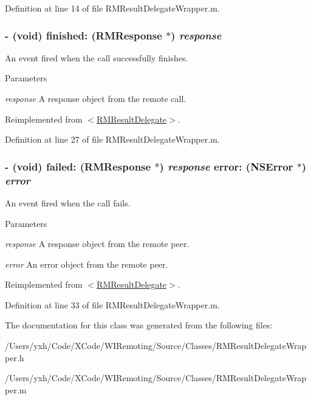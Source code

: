 Definition at line 14 of file RMResultDelegateWrapper.m.\hypertarget{interface_r_m_result_delegate_wrapper_ac631e09ab641294f124b0e7d81b455c3}{
\subsubsection[{finished:}]{\setlength{\rightskip}{0pt plus 5cm}-\/ (void) finished: ({\bf RMResponse} $\ast$) {\em response}}}
\label{interface_r_m_result_delegate_wrapper_ac631e09ab641294f124b0e7d81b455c3}


An event fired when the call successfully finishes. 
\begin{DoxyParams}{Parameters}
\item[{\em response}]A response object from the remote call. \end{DoxyParams}


Reimplemented from \hyperlink{protocol_r_m_result_delegate-p_a965fe7cc4e150bb6ecf7cbb02b9c7248}{$<$RMResultDelegate$>$}.

Definition at line 27 of file RMResultDelegateWrapper.m.\hypertarget{interface_r_m_result_delegate_wrapper_ad4fccdd6b67ba89b4abe76f64708b82c}{
\subsubsection[{failed:error:}]{\setlength{\rightskip}{0pt plus 5cm}-\/ (void) failed: ({\bf RMResponse} $\ast$) {\em response}\/ error: (NSError $\ast$) {\em error}}}
\label{interface_r_m_result_delegate_wrapper_ad4fccdd6b67ba89b4abe76f64708b82c}


An event fired when the call fails. 
\begin{DoxyParams}{Parameters}
\item[{\em response}]A response object from the remote peer. \item[{\em error}]An error object from the remote peer. \end{DoxyParams}


Reimplemented from \hyperlink{protocol_r_m_result_delegate-p_a3521cd9555449b32aabdb759d2dadce5}{$<$RMResultDelegate$>$}.

Definition at line 33 of file RMResultDelegateWrapper.m.

The documentation for this class was generated from the following files:\begin{DoxyCompactItemize}
\item 
/Users/yxh/Code/XCode/WIRemoting/Source/Classes/RMResultDelegateWrapper.h\item 
/Users/yxh/Code/XCode/WIRemoting/Source/Classes/RMResultDelegateWrapper.m\end{DoxyCompactItemize}
